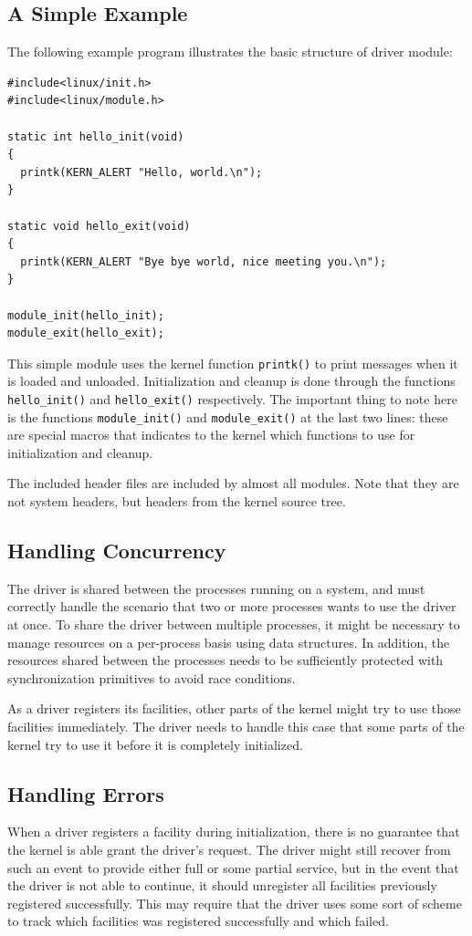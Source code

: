\subsection{A Simple Example}
The following example program illustrates the basic structure of driver module:
\lstset{style=lststyle-c}
\begin{lstlisting}
#include<linux/init.h>
#include<linux/module.h>

static int hello_init(void)
{
  printk(KERN_ALERT "Hello, world.\n");
}

static void hello_exit(void)
{
  printk(KERN_ALERT "Bye bye world, nice meeting you.\n");
}

module_init(hello_init);
module_exit(hello_exit);
\end{lstlisting}
This simple module uses the kernel function \texttt{printk()} to print messages when it is loaded and unloaded. Initialization and cleanup is done through the functions \texttt{hello\_init()} and \texttt{hello\_exit()} respectively. The important thing to note here is the functions \texttt{module\_init()} and \texttt{module\_exit()} at the last two lines: these are special macros that indicates to the kernel which functions to use for initialization and cleanup.

The included header files are included by almost all modules. Note that they are not system headers, but headers from the kernel source tree.


\subsection{Handling Concurrency}
The driver is shared between the processes running on a system, and must correctly handle the scenario that two or more processes wants to use the driver at once. To share the driver between multiple processes, it might be necessary to manage resources on a per-process basis using data structures. In addition, the resources shared between the processes needs to be sufficiently protected with synchronization primitives to avoid race conditions.

As a driver registers its facilities, other parts of the kernel might try to use those facilities immediately. The driver needs to handle this case that some parts of the kernel try to use it before it is completely initialized.


\subsection{Handling Errors}
When a driver registers a facility during initialization, there is no guarantee that the kernel is able grant the driver's request. The driver might still recover from such an event to provide either full or some partial service, but in the event that the driver is not able to continue, it should unregister all facilities previously registered successfully. This may require that the driver uses some sort of scheme to track which facilities was registered successfully and which failed. 


